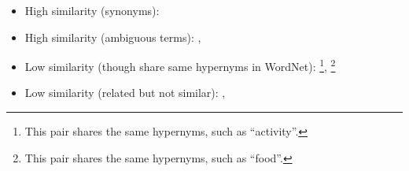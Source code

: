 \begin{itemize}
\item High similarity (synonyms): 
\item High similarity (ambiguous terms): ,

\item Low similarity (though share same hypernyms in WordNet):
\footnote{This pair shares the same hypernyms, such as ``activity''.},  \footnote{This pair shares the same hypernyms, such as ``food''.}

\item Low similarity (related but not similar): , 
%
\end{itemize}


